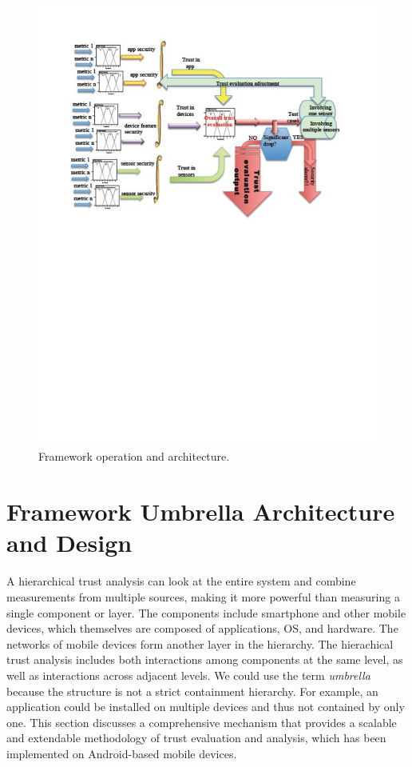 \begin{figure}[ht]
\centering
\includegraphics[width=6in]{umbrella_framework.pdf}
\caption{Framework operation and architecture.}
\label{fig:umbrella}
\end{figure}

\section{Framework Umbrella Architecture and Design}\label{sec-umbrella}

A hierarchical trust analysis can look at the entire system and combine measurements from multiple sources, making
it more powerful than measuring a single component or layer.  The components include smartphone and other mobile
devices, which themselves are composed of applications, OS, and hardware. The networks of mobile devices form another 
layer in the hierarchy.  The hierachical trust analysis includes both interactions among components at the same level,
as well as interactions across adjacent levels.  We could use the term {\it umbrella} because the structure is not
a strict containment hierarchy.  For example, an application could be installed on multiple devices and thus not
contained by only one.
This section discusses a comprehensive mechanism that provides a scalable and extendable methodology of trust
 evaluation and analysis, which has been implemented on Android-based mobile devices.
 
